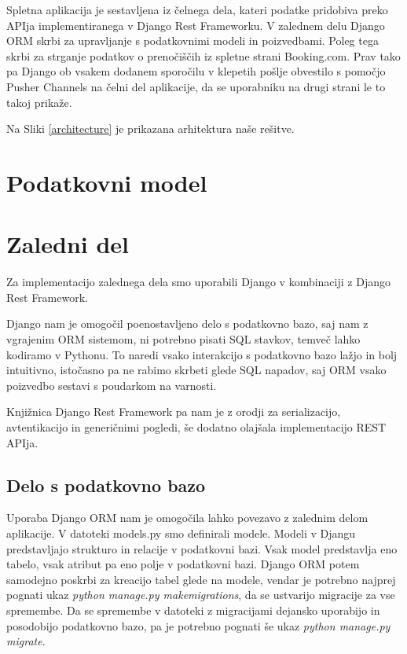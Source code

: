 \documentclass[a4paper,12pt,openright]{book}
\begin{document}
Spletna aplikacija je sestavljena iz čelnega dela, kateri podatke pridobiva preko APIja implementiranega v Django Rest Frameworku.
V zalednem delu Django ORM skrbi za upravljanje s podatkovnimi modeli in poizvedbami.
Poleg tega skrbi za strganje podatkov o prenočiščih iz spletne strani Booking.com.
Prav tako pa Django ob vsakem dodanem sporočilu v klepetih pošlje obvestilo s pomočjo Pusher Channels na čelni del aplikacije, da se uporabniku na drugi strani le to takoj prikaže.

Na Sliki \ref{architecture} je prikazana arhitektura naše rešitve.

\section{Podatkovni model}

\section{Zaledni del}
Za implementacijo zalednega dela smo uporabili Django v kombinaciji z Django Rest Framework.

Django nam je omogočil poenostavljeno delo s podatkovno bazo, saj nam z vgrajenim ORM sistemom, ni potrebno pisati SQL stavkov, temveč lahko kodiramo v Pythonu.
To naredi vsako interakcijo s podatkovno bazo lažjo in bolj intuitivno, istočasno pa ne rabimo skrbeti glede SQL napadov, saj ORM vsako poizvedbo sestavi s poudarkom na varnosti. 

Knjižnica Django Rest Framework pa nam je z orodji za serializacijo, avtentikacijo in generičnimi pogledi, še dodatno olajšala implementacijo REST APIja.

\subsection{Delo s podatkovno bazo}
Uporaba Django ORM nam je omogočila lahko povezavo z zalednim delom aplikacije.
V datoteki models.py smo definirali modele.
Modeli v Djangu predstavljajo strukturo in relacije v podatkovni bazi.
Vsak model predstavlja eno tabelo, vsak atribut pa eno polje v podatkovni bazi.
Django ORM potem samodejno poskrbi za kreacijo tabel glede na modele, vendar je potrebno najprej pognati ukaz \textit{python manage.py makemigrations}, da se ustvarijo migracije za vse spremembe.
Da se spremembe v datoteki z migracijami dejansko uporabijo in posodobijo podatkovno bazo, pa je potrebno pognati še ukaz \textit{python manage.py migrate}.
\end{document}
